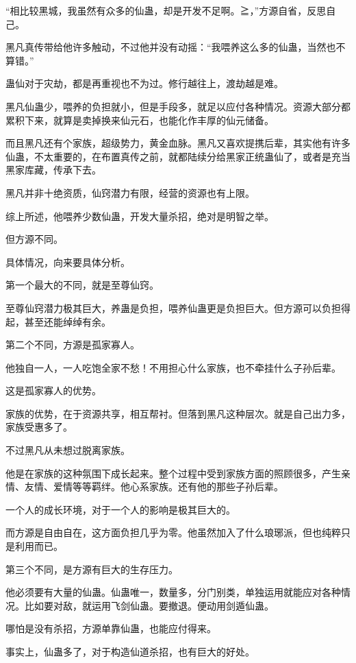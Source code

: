 
\begin{this_body}

“相比较黑城，我虽然有众多的仙蛊，却是开发不足啊。≧，”方源自省，反思自己。

黑凡真传带给他许多触动，不过他并没有动摇：“我喂养这么多的仙蛊，当然也不算错。”

蛊仙对于灾劫，都是再重视也不为过。修行越往上，渡劫越是难。

黑凡仙蛊少，喂养的负担就小，但是手段多，就足以应付各种情况。资源大部分都累积下来，就算是卖掉换来仙元石，也能化作丰厚的仙元储备。

而且黑凡还有个家族，超级势力，黄金血脉。黑凡又喜欢提携后辈，其实他有许多仙蛊，不太重要的，在布置真传之前，就都陆续分给黑家正统蛊仙了，或者是充当黑家库藏，传承下去。

黑凡并非十绝资质，仙窍潜力有限，经营的资源也有上限。

综上所述，他喂养少数仙蛊，开发大量杀招，绝对是明智之举。

但方源不同。

具体情况，向来要具体分析。

第一个最大的不同，就是至尊仙窍。

至尊仙窍潜力极其巨大，养蛊是负担，喂养仙蛊更是负担巨大。但方源可以负担得起，甚至还能绰绰有余。

第二个不同，方源是孤家寡人。

他独自一人，一人吃饱全家不愁！不用担心什么家族，也不牵挂什么子孙后辈。

这是孤家寡人的优势。

家族的优势，在于资源共享，相互帮衬。但落到黑凡这种层次。就是自己出力多，家族受惠多了。

不过黑凡从未想过脱离家族。

他是在家族的这种氛围下成长起来。整个过程中受到家族方面的照顾很多，产生亲情、友情、爱情等等羁绊。他心系家族。还有他的那些子孙后辈。

一个人的成长环境，对于一个人的影响是极其巨大的。

而方源是自由自在，这方面负担几乎为零。他虽然加入了什么琅琊派，但也纯粹只是利用而已。

第三个不同，是方源有巨大的生存压力。

他必须要有大量的仙蛊。仙蛊唯一，数量多，分门别类，单独运用就能应对各种情况。比如要对敌，就运用飞剑仙蛊。要撤退。便动用剑遁仙蛊。

哪怕是没有杀招，方源单靠仙蛊，也能应付得来。

事实上，仙蛊多了，对于构造仙道杀招，也有巨大的好处。


\end{this_body}

